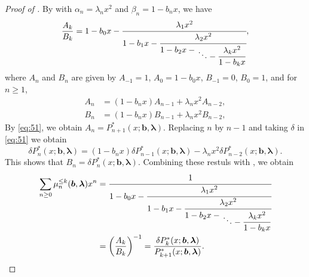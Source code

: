 \documentclass[oneside]{book}
\numberwithin{equation}{section}
\newtheorem{lem}[thm]{Lemma}
\theoremstyle{definition}
\renewcommand\vec[1]{\bm{#1}}
\newcommand\vb{\vec{b}}
\newcommand\vla{\vec{\lambda}}
\begin{document}
\begin{proof}[Proof of ]
  By  with
  \( \alpha_n = \lambda_n x^2 \)
  and \( \beta_n = 1-b_nx \), we have
  \[
    \frac{A_k}{B_k} = 1-b_0x- \cfrac{\lambda_1x^2}{ 1-b_1x-
      \cfrac{\lambda_2x^2}{ 1-b_2x-
        \genfrac{}{}{0pt}{1}{}{\displaystyle\ddots -
          \cfrac{\lambda_kx^2}{1-b_kx}}} },
  \]
  where \( A_n \) and \( B_n \) are given by
  \( A_{-1} = 1 \), \( A_0=1-b_0x \),
  \( B_{-1} = 0 \), \( B_0=1 \), and for \( n\ge1 \),
  \begin{align*}
    A_n &= (1-b_nx) A_{n-1} + \lambda_n x^2 A_{n-2},\\
    B_n &= (1-b_nx) B_{n-1} + \lambda_n x^2 B_{n-2},
  \end{align*}
  By \eqref{eq:51}, we obtain \( A_n = P^*_{n+1}(x;\vb,\vla) \).
  Replacing \( n \) by \( n-1 \) and taking \( \delta \) in \eqref{eq:51} we obtain
  \[
  \delta P^*_{n}(x;\vb,\vla) = (1-b_{n}x) \delta P^*_{n-1}(x;\vb,\vla) - \lambda_{n} x^2  \delta P^*_{n-2}(x;\vb,\vla).
\]
This shows that \( B_n = \delta P^*_n(x;\vb,\vla) \).
Combining these restuls with 
, we obtain
\begin{align*}
  \sum_{n\ge0} \mu_n^{\le k}(\vb,\vla)x^n
  &= \cfrac{1}{
    1-b_0x- \cfrac{\lambda_1x^2}{
      1-b_1x- \cfrac{\lambda_2x^2}{
        1-b_2x- \genfrac{}{}{0pt}{1}{}{\displaystyle\ddots -
    \cfrac{\lambda_kx^2}{1-b_kx}}} }}\\
  &= \left(\frac{A_k}{B_k}\right)^{-1} = \frac{\delta P^*_k(x;\vb,\vla)}{P^*_{k+1}(x;\vb,\vla)}.
    \qedhere
\end{align*}
\end{proof}


\end{document}
